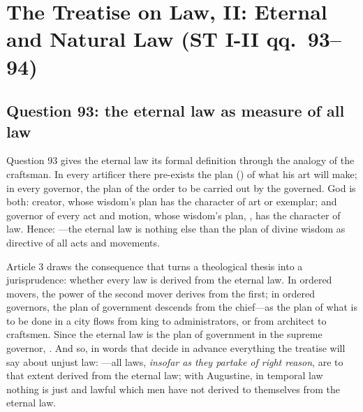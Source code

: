 \section{The Treatise on Law, II: Eternal and Natural Law (ST I-II qq.~93--94)}

\subsection{Question 93: the eternal law as measure of all law}

Question 93 gives the eternal law its formal definition through the analogy of the craftsman. In every artificer there pre-exists the plan () of what his art will make; in every governor, the plan of the order to be carried out by the governed. God is both: creator, whose wisdom's plan has the character of art or exemplar; and governor of every act and motion, whose wisdom's plan, , has the character of law. Hence: ---the eternal law is nothing else than the plan of divine wisdom as directive of all acts and movements.

Article 3 draws the consequence that turns a theological thesis into a jurisprudence: whether every law is derived from the eternal law. In ordered movers, the power of the second mover derives from the first; in ordered governors, the plan of government descends from the chief---as the plan of what is to be done in a city flows from king to administrators, or from architect to craftsmen. Since the eternal law is the plan of government in the supreme governor, . And so, in words that decide in advance everything the treatise will say about unjust law: ---all laws, \emph{insofar as they partake of right reason}, are to that extent derived from the eternal law; with Augustine, in temporal law nothing is just and lawful which men have not derived to themselves from the eternal law.

